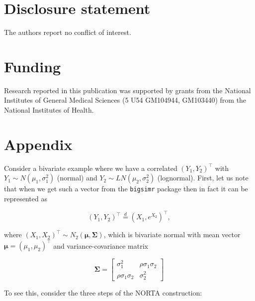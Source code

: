 \documentclass[
]{jss}
\begin{document}
\hypertarget{coi}{%
\section*{Disclosure statement}\label{coi}}

The authors report no conflict of interest.

\hypertarget{funding}{%
\section*{Funding}\label{funding}}

Research reported in this publication was supported by grants from the
National Institutes of General Medical Sciences (5 U54 GM104944,
GM103440) from the National Institutes of Health.

\newpage

\hypertarget{appendix}{%
\section*{Appendix}\label{appendix}}

\noindent Consider a bivariate example where we have a correlated
\((Y_1, Y_2)^\top\) with \(Y_1\sim N(\mu_1, \sigma_1^2)\) (normal) and
\(Y_2\sim LN(\mu_2, \sigma_2^2)\) (lognormal). First, let us note that
when we get such a vector from the \texttt{bigsimr} package then in fact
it can be represented as

\begin{equation}
\label{eq:kram1}
(Y_1, Y_2)^\top \stackrel{d}{=} \left(X_1, e^{X_2}\right)^\top,
\end{equation}

where \((X_1, X_2)^\top \sim N_2(\boldsymbol \mu, \boldsymbol \Sigma)\),
which is bivariate normal with mean vector
\(\boldsymbol \mu = (\mu_1, \mu_2)^\top\) and variance-covariance matrix

\begin{equation}
\label{eq:kram2}
\boldsymbol \Sigma = 
\begin{bmatrix}
\sigma_1^2 & \rho \sigma_1\sigma_2\\
\rho \sigma_1\sigma_2 & \sigma_2^2
\end{bmatrix}
\end{equation}

To see this, consider the three steps of the NORTA construction:
\end{document}
